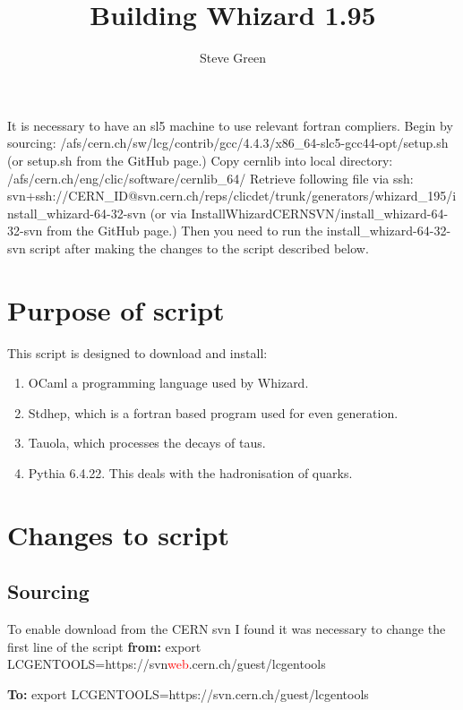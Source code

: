 \documentclass[11pt, oneside]{article}   	%
\title{Building Whizard 1.95}
\author{Steve Green}
\date{}							%
\begin{document}
\maketitle
It is necessary to have an sl5 machine to use relevant fortran compliers.
Begin by sourcing: /afs/cern.ch/sw/lcg/contrib/gcc/4.4.3/x86\_64-slc5-gcc44-opt/setup.sh (or setup.sh from the GitHub page.)
Copy cernlib into local directory: /afs/cern.ch/eng/clic/software/cernlib\_64/
Retrieve following file via ssh: svn+ssh://CERN\_ID@svn.cern.ch/reps/clicdet/trunk/generators/whizard\_195/install\_whizard-64-32-svn (or via 	InstallWhizardCERNSVN/install\_whizard-64-32-svn from the GitHub page.)
Then you need to run the install\_whizard-64-32-svn script after making the changes to the script described below.

\section{Purpose of script}

This script is designed to download and install:
\begin{enumerate}
\item OCaml a programming language used by Whizard.
\item Stdhep, which is a fortran based program used for even generation.
\item Tauola, which processes the decays of taus.
\item Pythia 6.4.22.  This deals with the hadronisation of quarks.
\end{enumerate}

\section{Changes to script}
\subsection{Sourcing}
To enable download from the CERN svn I found it was necessary to change the first line of the script \textbf{from:} \newline
export LCGENTOOLS=https://svn\textcolor{red}{web}.cern.ch/guest/lcgentools \newline

\textbf{To:} \newline
export LCGENTOOLS=https://svn.cern.ch/guest/lcgentools \newline
\end{document}
